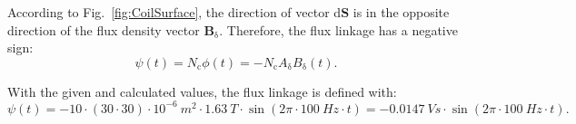 \begin{solutionblock}

    According to Fig.~\ref{fig:CoilSurface}, the direction of vector d$\boldsymbol{S}$ is in the opposite direction of the flux density vector $\boldsymbol{{B}}_{\updelta}$. Therefore, the flux linkage has a negative sign:
    \begin{equation}
        \psi(t) = N_{\mathrm{c}} \phi(t)
        = - N_{\mathrm{c}} A_{\mathrm{\updelta}} B_{\mathrm{\updelta}}(t).
    \end{equation}

    With the given and calculated values, the flux linkage is defined with:
    \begin{equation}
        \psi(t) = -10 \cdot (30 \cdot 30) \cdot 10^{-6} \ \si{m^2} \cdot 1.63 \ \si{T} \cdot \sin(2 \pi  \cdot 100 \ \si{Hz} \cdot t)
        = -0.0147 \ \si{Vs} \cdot \sin(2 \pi \cdot 100 \ \si{Hz} \cdot t).
    \end{equation}

\end{solutionblock}



